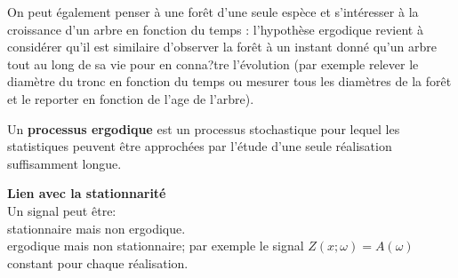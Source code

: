 \documentclass{article}
\begin{document}
On peut également penser à une forêt d'une seule espèce et s'intéresser à la croissance d'un arbre en fonction du temps : l'hypothèse ergodique revient à considérer qu'il est similaire d'observer la forêt à un instant donné qu'un arbre tout au long de sa vie pour en conna?tre l'évolution (par exemple relever le diamètre du tronc en fonction du temps ou mesurer tous les diamètres de la forêt et le reporter en fonction de l'age de l'arbre).

\bigskip
Un \textbf{processus ergodique} est un processus stochastique pour lequel les statistiques peuvent être approchées par l'étude d'une seule réalisation suffisamment longue.

\bigskip
\textbf{Lien avec la stationnarité}\\
Un signal peut être:\\
stationnaire mais non ergodique.\\
ergodique mais non stationnaire; par exemple le signal $Z(x; \omega)=A(\omega)$ constant pour chaque réalisation.
\end{document}
